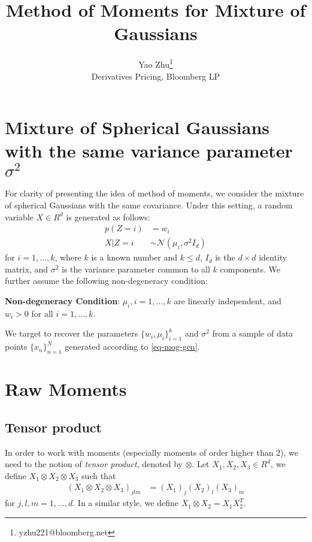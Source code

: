 \documentclass{article}
\title{Method of Moments for Mixture of Gaussians}
\author{Yao Zhu\thanks{yzhu221@bloomberg.net}\\ Derivatives Pricing, Bloomberg LP}
\date{}
\begin{document}
\maketitle

\section{Mixture of Spherical Gaussians with the same variance parameter $\sigma^2$}
For clarity of presenting the idea of method of moments, we consider the mixture of spherical Gaussians with the same covariance. Under this setting, a random variable $X\in R^{d}$ is generated as follows:
\begin{align}
p(Z=i) &= w_i
\label{eq-mog-gen}
\\
\nonumber
X|Z=i &\sim \mathcal{N}(\mu_i,\sigma^2 I_{d})
\end{align}
for $i=1,\ldots,k$, where $k$ is a known number and $k\leq d$, $I_d$ is the $d\times d$ identity matrix, and $\sigma^2$ is the variance parameter common to all $k$ components. We further assume the following non-degeneracy condition:
\par
\textbf{Non-degeneracy Condition}: $\mu_i,i=1,\ldots,k$ are linearly independent, and $w_i>0$ for all $i=1,\ldots,k$.
\par
We target to recover the parameters $\{w_i,\mu_i\}_{i=1}^k$ and $\sigma^2$ from a sample of data points $\{x_n\}_{n=1}^N$ generated according to \eqref{eq-mog-gen}.
\section{Raw Moments}
\subsection{Tensor product}
In order to work with moments (especially moments of order higher than $2$), we need to the notion of \textit{tensor product}, denoted by $\otimes$. Let $X_1,X_2,X_3\in R^{d}$, we define $X_1\otimes X_2\otimes X_3$ such that
\begin{align}
\left(X_1\otimes X_2\otimes X_3\right)_{jlm} &= (X_1)_{j}(X_2)_{l}(X_3)_{m}
\end{align}
for $j,l,m=1,\ldots, d$. In a similar style, we define $X_1\otimes X_2=X_1 X_2^{T}$.
\end{document}
